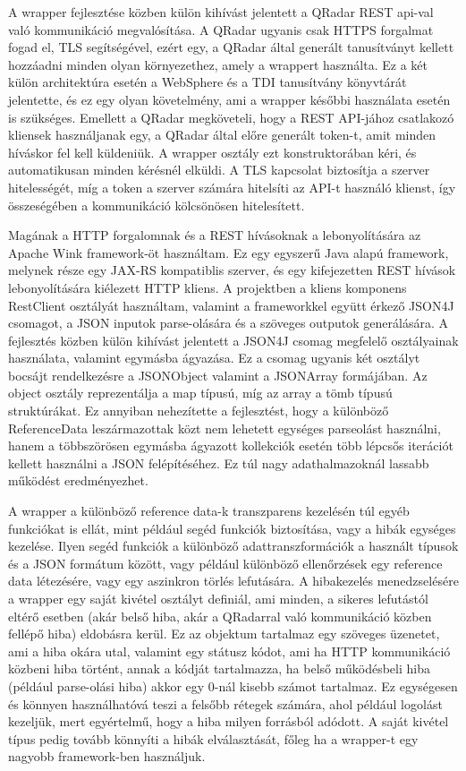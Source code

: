 A wrapper fejlesztése közben külön kihívást jelentett a QRadar REST api-val való kommunikáció megvalósítása. A QRadar ugyanis csak HTTPS forgalmat fogad el, TLS segítségével, ezért egy, a QRadar által generált tanusítványt kellett hozzáadni minden olyan környezethez, amely a wrappert használta. Ez a két külön architektúra esetén a WebSphere és a TDI tanusítvány könyvtárát jelentette, és ez egy olyan követelmény, ami a wrapper későbbi használata esetén is szükséges. Emellett a QRadar megköveteli, hogy a REST API-jához csatlakozó kliensek használjanak egy, a QRadar által előre generált token-t, amit minden híváskor fel kell küldeniük. A wrapper osztály ezt konstruktorában kéri, és automatikusan minden kérésnél elküldi. A TLS kapcsolat biztosítja a szerver hitelességét, míg a token a szerver számára hitelsíti az API-t használó klienst, így összeségében a kommunikáció kölcsönösen hitelesített.

Magának a HTTP forgalomnak és a REST hívásoknak a lebonyolítására az Apache Wink\cite{wink} framework-öt használtam. Ez egy egyszerű Java alapú framework, melynek része egy JAX-RS kompatiblis szerver, és egy kifejezetten REST hívások lebonyolítására kiélezett HTTP kliens. A projektben a kliens komponens RestClient osztályát használtam, valamint a frameworkkel együtt érkező JSON4J csomagot, a JSON inputok parse-olására és a szöveges outputok generálására. A fejlesztés közben külön kihívást jelentett a JSON4J csomag megfelelő osztályainak használata, valamint egymásba ágyazása. Ez a csomag ugyanis két osztályt bocsájt rendelkezésre a JSONObject valamint a JSONArray formájában. Az object osztály reprezentálja a map típusú, míg az array a tömb típusú struktúrákat. Ez annyiban nehezítette a fejlesztést, hogy a különböző ReferenceData leszármazottak közt nem lehetett egységes parseolást használni, hanem a többszörösen egymásba ágyazott kollekciók esetén több lépcsős iterációt kellett használni a JSON felépítéséhez. Ez túl nagy adathalmazoknál lassabb működést eredményezhet.

A wrapper a különböző reference data-k transzparens kezelésén túl egyéb funkciókat is ellát, mint például segéd funkciók biztosítása, vagy a hibák egységes kezelése. Ilyen segéd funkciók a különböző adattranszformációk a használt típusok és a JSON formátum között, vagy például különböző ellenőrzések egy reference data létezésére, vagy egy aszinkron törlés lefutására. A hibakezelés menedzselésére a wrapper egy saját kivétel osztályt definiál, ami minden, a sikeres lefutástól eltérő esetben (akár belső hiba, akár a QRadarral való kommunikáció közben fellépő hiba) eldobásra kerül. Ez az objektum tartalmaz egy szöveges üzenetet, ami a hiba okára utal, valamint egy státusz kódot, ami ha HTTP kommunikáció közbeni hiba történt, annak a kódját tartalmazza, ha belső működésbeli hiba (például parse-olási hiba) akkor egy 0-nál kisebb számot tartalmaz. Ez egységesen és könnyen használhatóvá teszi a felsőbb rétegek számára, ahol például logolást kezeljük, mert egyértelmű, hogy a hiba milyen forrásból adódott. A saját kivétel típus pedig tovább könnyíti a hibák elválasztását, főleg ha a wrapper-t egy nagyobb framework-ben használjuk.

